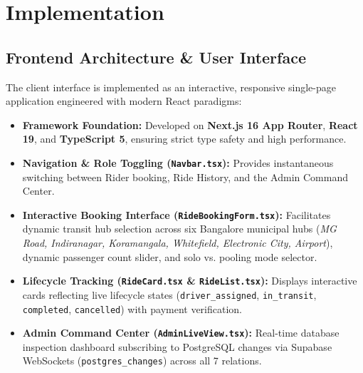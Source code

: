 \chapter{Implementation}

\section{Frontend Architecture \& User Interface}
The client interface is implemented as an interactive, responsive single-page application engineered with modern React paradigms:
\begin{itemize}[itemsep=1.5pt, topsep=2pt, parsep=0pt]
    \item \textbf{Framework Foundation:} Developed on \textbf{Next.js 16 App Router}, \textbf{React 19}, and \textbf{TypeScript 5}, ensuring strict type safety and high performance.
    \item \textbf{Navigation \& Role Toggling (\texttt{Navbar.tsx}):} Provides instantaneous switching between Rider booking, Ride History, and the Admin Command Center.
    \item \textbf{Interactive Booking Interface (\texttt{RideBookingForm.tsx}):} Facilitates dynamic transit hub selection across six Bangalore municipal hubs (\textit{MG Road, Indiranagar, Koramangala, Whitefield, Electronic City, Airport}), dynamic passenger count slider, and solo vs. pooling mode selector.
    \item \textbf{Lifecycle Tracking (\texttt{RideCard.tsx} \& \texttt{RideList.tsx}):} Displays interactive cards reflecting live lifecycle states (\texttt{driver\_assigned}, \texttt{in\_transit}, \texttt{completed}, \texttt{cancelled}) with payment verification.
    \item \textbf{Admin Command Center (\texttt{AdminLiveView.tsx}):} Real-time database inspection dashboard subscribing to PostgreSQL changes via Supabase WebSockets (\texttt{postgres\_changes}) across all 7 relations.
\end{itemize}

